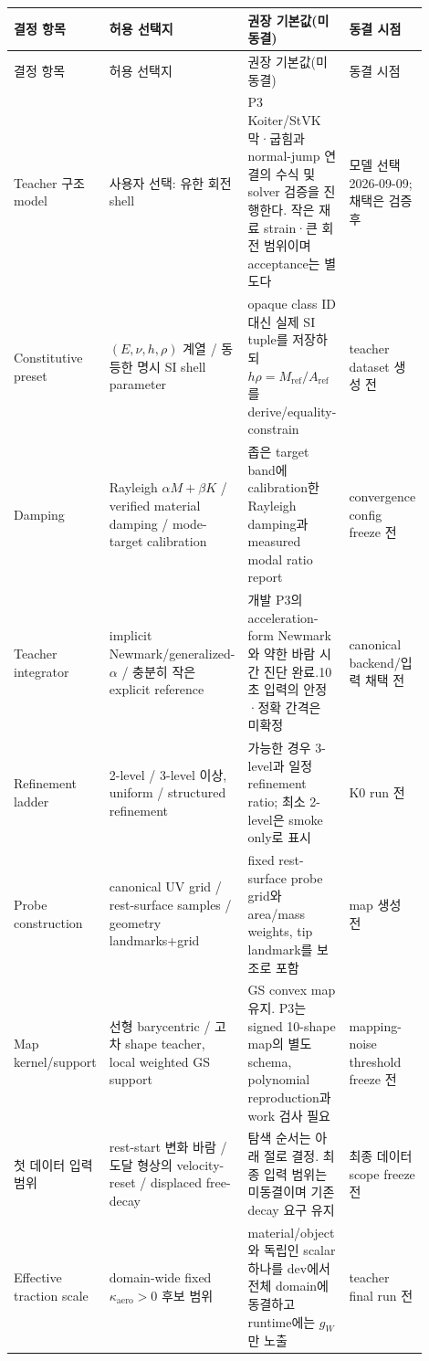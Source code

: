 \documentclass[10pt]{article}
\begin{document}
\begin{longtable}{L{0.18\linewidth}L{0.27\linewidth}L{0.29\linewidth}L{0.16\linewidth}}
\toprule
결정 항목 & 허용 선택지 & 권장 기본값(미동결) & 동결 시점\\
\midrule
\endfirsthead
\toprule
결정 항목 & 허용 선택지 & 권장 기본값(미동결) & 동결 시점\\
\midrule
\endhead
Teacher 구조 model & 사용자 선택: 유한 회전 shell & P3 Koiter/StVK 막·굽힘과 normal-jump 연결의 수식 및 solver 검증을 진행한다. 작은 재료 strain·큰 회전 범위이며 acceptance는 별도다 & 모델 선택 2026-09-09; 채택은 검증 후\\
Constitutive preset & \((E,\nu,h,\rho)\) 계열 / 동등한 명시 SI shell parameter & opaque class ID 대신 실제 SI tuple를 저장하되 \(h\rho=M_{\mathrm{ref}}/A_{\mathrm{ref}}\)를 derive/equality-constrain & teacher dataset 생성 전\\
Damping & Rayleigh \(\alpha M+\beta K\) / verified material damping / mode-target calibration & 좁은 target band에 calibration한 Rayleigh damping과 measured modal ratio report & convergence config freeze 전\\
Teacher integrator & implicit Newmark/generalized-\(\alpha\) / 충분히 작은 explicit reference & 개발 P3의 acceleration-form Newmark와 약한 바람 시간 진단 완료.10초 입력의 안정·정확 간격은 미확정 & canonical backend/입력 채택 전\\
Refinement ladder & 2-level / 3-level 이상, uniform / structured refinement & 가능한 경우 3-level과 일정 refinement ratio; 최소 2-level은 smoke only로 표시 & K0 run 전\\
Probe construction & canonical UV grid / rest-surface samples / geometry landmarks+grid & fixed rest-surface probe grid와 area/mass weights, tip landmark를 보조로 포함 & map 생성 전\\
Map kernel/support & 선형 barycentric / 고차 shape teacher, local weighted GS support & GS convex map 유지. P3는 signed 10-shape map의 별도 schema, polynomial reproduction과 work 검사 필요 & mapping-noise threshold freeze 전\\
첫 데이터 입력 범위 & rest-start 변화 바람 / 도달 형상의 velocity-reset / displaced free-decay & 탐색 순서는 아래 절로 결정. 최종 입력 범위는 미동결이며 기존 decay 요구 유지 & 최종 데이터 scope freeze 전\\
Effective traction scale & domain-wide fixed \(\kappa_{\mathrm{aero}}>0\) 후보 범위 & material/object와 독립인 scalar 하나를 dev에서 전체 domain에 동결하고 runtime에는 \(g_W\)만 노출 & teacher final run 전\\

\end{longtable}
\end{document}

